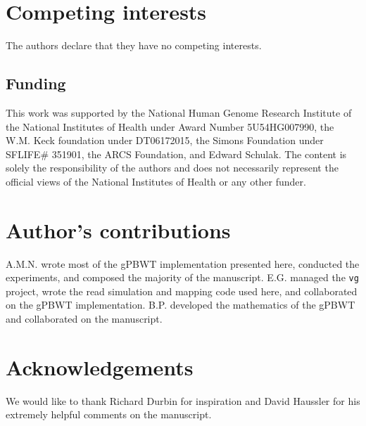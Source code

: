 \section{Competing interests}
The authors declare that they have no competing interests.

\subsection{Funding}
This work was supported by the National Human Genome Research Institute of the National Institutes of Health under Award Number 5U54HG007990, the W.M. Keck foundation under DT06172015, the Simons Foundation under SFLIFE\# 351901, the ARCS Foundation, and Edward Schulak. The content is solely the responsibility of the authors and does not necessarily represent the official views of the National Institutes of Health or any other funder.

\section{Author's contributions}
    A.M.N. wrote most of the gPBWT implementation presented here, conducted the experiments, and composed the majority of the manuscript. E.G. managed the \texttt{vg} project, wrote the read simulation and mapping code used here, and collaborated on the gPBWT implementation. B.P. developed the mathematics of the gPBWT and collaborated on the manuscript.

\section{Acknowledgements}
We would like to thank Richard Durbin for inspiration and David Haussler for his extremely helpful comments on the manuscript.

